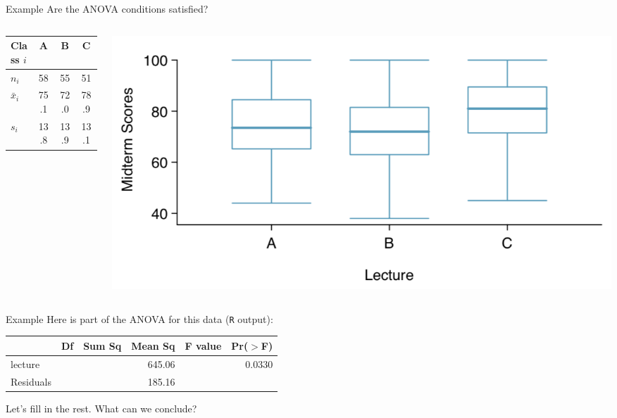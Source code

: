\begin{frame}{Example}
    Are the ANOVA conditions satisfied?
    \begin{columns}\begin{column}{0.4\textwidth}
        \small{\begin{tabular}{l ccc}
            \hline
            Class $i$ & A & B & C \\
            \hline
            $n_i$ & 58 & 55 & 51 \\
            $\bar{x}_i$ & 75.1 & 72.0 & 78.9 \\
            $s_i$ & 13.8 & 13.9 & 13.1 \\
            \hline
        \end{tabular}}
    \end{column}\begin{column}{0.6\textwidth}
        \begin{center}
            \includegraphics[scale=0.4]{images/examboxplts.png}
        \end{center}
    \end{column}\end{columns}
\end{frame}

\begin{frame}{Example}
    Here is part of the ANOVA for this data (\texttt{R} output):
    \begin{table}[]
        \centering
        \begin{tabular}{l rrrrr}
            \hline
             & Df & Sum Sq & Mean Sq & F value & Pr($>$F) \\
            \hline
            lecture     & & & 645.06 & & 0.0330 \\
            Residuals   & & & 185.16 & & \\
            \hline
        \end{tabular}
    \end{table}
    Let's fill in the rest. What can we conclude?
\end{frame}

